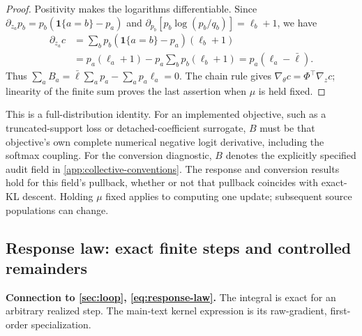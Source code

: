 \begin{proof}
Positivity makes the logarithms differentiable. Since
$\partial_{z_a}p_b=p_b(\mathbf1\{a=b\}-p_a)$ and
$\partial_{p_b}[p_b\log(p_b/q_b)]=\ell_b+1$, we have
\begin{align*}
 \partial_{z_a}c
 &=\sum_b p_b(\mathbf1\{a=b\}-p_a)(\ell_b+1)\\
 &=p_a(\ell_a+1)-p_a\sum_b p_b(\ell_b+1)
 =p_a(\ell_a-\bar\ell).
\end{align*}
Thus $\sum_a B_a=\bar\ell\sum_a p_a-\sum_a p_a\ell_a=0$.
The chain rule gives $\nabla_\theta c=\Phi^\top\nabla_z c$; linearity of the finite sum proves the last assertion when $\mu$ is held fixed.
\end{proof}

This is a full-distribution identity. For an implemented objective, such as a truncated-support loss or detached-coefficient surrogate, $B$ must be that objective's own complete numerical negative logit derivative, including the softmax coupling. For the conversion diagnostic, $B$ denotes the explicitly specified audit field in \cref{app:collective-conventions}. The response and conversion results hold for this field's pullback, whether or not that pullback coincides with exact-KL descent. Holding $\mu$ fixed applies to computing one update; subsequent source populations can change.

\subsection{Response law: exact finite steps and controlled remainders}
\label{app:ftc}
\textbf{Connection to \cref{sec:loop}, \cref{eq:response-law}.} The integral is exact for an arbitrary realized step. The main-text kernel expression is its raw-gradient, first-order specialization.

